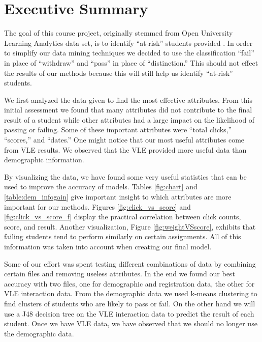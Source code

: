 \documentclass[12pt]{article}
\begin{document}

\tableofcontents
\pagebreak


\section{Executive Summary}

The goal of this course project, originally stemmed from Open University Learning Analytics data set, is to identify ``at-risk'' students 
provided \cite{oulad}. In order to simplify our data mining techniques we decided to use the classification ``fail'' in place of ``withdraw'' and ``pass'' in place of ``distinction.'' This should not effect the results of our methods because this will still help us identify ``at-risk'' students. 

We first analyzed the data given to find the most effective attributes. From this initial assessment we found that many attributes did not contribute to the final result of a student while other attributes had a large impact on the likelihood of passing or failing. Some of these important attributes were ``total clicks,'' ``scores,'' and ``dates.'' One might notice that our most useful attributes come from VLE results. We observed that the VLE provided more useful data than demographic information.

By visualizing the data, we have found some very useful statistics that can be used to improve the accuracy of models. Tables \ref{fig:chart} and \ref{table:dem_infogain} give important insight to which attributes are more important for our methods. Figures \ref{fig:click_vs_score} and \ref{fig:click_vs_score_f} display the practical correlation between click counts, score, and result. Another visualization, Figure \ref{fig:weightVSscore}, exhibits that failing students tend to perform similarly on certain assignments. All of this information was taken into account when creating our final model. 

Some of our effort was spent testing different combinations of data by combining certain files and removing useless attributes. In the end we found our best accuracy with two files, one for demographic and registration data, the other for VLE interaction data. From the demographic data we used k-means clustering to find clusters of students who are likely to pass or fail. On the other hand we will use a J48 decision tree on the VLE interaction data to predict the result of each student. Once we have VLE data, we have observed that we should no longer use the demographic data.
\end{document}
